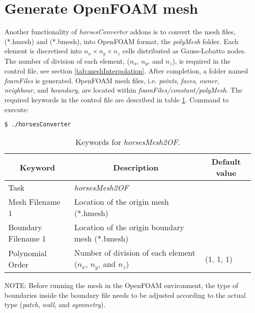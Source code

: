 \documentclass[a4paper,10pt]{report}
\begin{document}
\section{Generate OpenFOAM mesh} \label{tab:horsesMesh2OF}
Another functionality of \textit{horsesConverter} addons is to convert the mesh files, (*.hmesh) and (*.bmesh), into OpenFOAM format, the \textit{polyMesh} folder. Each element is discretised into $n_x \times n_y \times n_z$ cells distributed as Gauss-Lobatto nodes. The number of division of each element, ($n_x$, $n_y$, and $n_z$), is required in the control file, see section \ref{tab:meshInterpolation}. After completion, a folder named \emph{foamFiles} is generated. OpenFOAM mesh files, i.e. \textit{points}, \textit{faces}, \textit{owner}, \textit{neighbour}, and \textit{boundary}, are located within \emph{foamFiles/constant/polyMesh}. The required keywords in the control file are described in table \ref{tab:horsesMesh2of}. Command to execute:

\begin{lstlisting}[language=bash]
	$ ./horsesConverter
\end{lstlisting}

\begin{longtable}{|p{4cm}|p{10cm}|p{2.2cm}|}
\caption{Keywords for \textit{horsesMesh2OF}.} \label{tab:horsesMesh2of} \\
\hline
\multicolumn{1}{|c|}{\textbf{Keyword}} & \multicolumn{1}{c|}{\textbf{Description}} & \multicolumn{1}{c|}{\textbf{Default value}} \\ \hline
\endfirsthead

Task 	        		& \textit{horsesMesh2OF} 						&  \\ \hline
Mesh Filename 1 		& Location of the origin mesh (*.hmesh) 	&  \\ \hline
Boundary Filename 1 	& Location of the origin boundary mesh (*.bmesh) 	&  \\ \hline
Polynomial Order 	& Number of division of each element ($n_x$, $n_y$, and $n_z$) 	& (1, 1, 1) \\ \hline
\end{longtable}

NOTE: Before running the mesh in the OpenFOAM environment, the type of boundaries inside the boundary file needs to be adjusted according to the actual type (\textit{patch}, \textit{wall}, and \textit{symmetry}).
\end{document}
